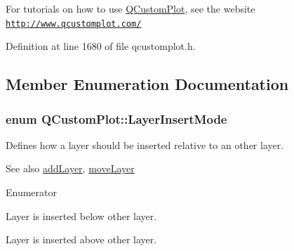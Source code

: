 For tutorials on how to use \hyperlink{class_q_custom_plot}{Q\+Custom\+Plot}, see the website~\newline
\href{http://www.qcustomplot.com/}{\tt http\+://www.\+qcustomplot.\+com/} 

Definition at line 1680 of file qcustomplot.\+h.



\subsection{Member Enumeration Documentation}
\hypertarget{class_q_custom_plot_a75a8afbe6ef333b1f3d47abb25b9add7}{}
\subsubsection[{Layer\+Insert\+Mode}]{\setlength{\rightskip}{0pt plus 5cm}enum {\bf Q\+Custom\+Plot\+::\+Layer\+Insert\+Mode}}\label{class_q_custom_plot_a75a8afbe6ef333b1f3d47abb25b9add7}
Defines how a layer should be inserted relative to an other layer.

\begin{DoxySeeAlso}{See also}
\hyperlink{class_q_custom_plot_ad5255393df078448bb6ac83fa5db5f52}{add\+Layer}, \hyperlink{class_q_custom_plot_ae896140beff19424e9e9e02d6e331104}{move\+Layer} 
\end{DoxySeeAlso}
\begin{Desc}
\item[Enumerator]\par
\begin{description}
\item[{\em 
\hypertarget{class_q_custom_plot_a75a8afbe6ef333b1f3d47abb25b9add7aee39cf650cd24e68552da0b697ce4a93}{}lim\+Below\label{class_q_custom_plot_a75a8afbe6ef333b1f3d47abb25b9add7aee39cf650cd24e68552da0b697ce4a93}
}]Layer is inserted below other layer. \item[{\em 
\hypertarget{class_q_custom_plot_a75a8afbe6ef333b1f3d47abb25b9add7a062b0b7825650b432a713c0df6742d41}{}lim\+Above\label{class_q_custom_plot_a75a8afbe6ef333b1f3d47abb25b9add7a062b0b7825650b432a713c0df6742d41}
}]Layer is inserted above other layer. \end{description}
\end{Desc}


